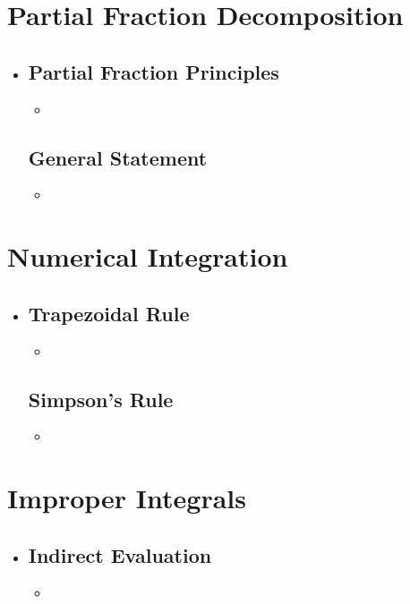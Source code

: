 \section{Partial Fraction Decomposition}
\begin{itemize}
  \item[]

  \subsection{Partial Fraction Principles}
  \begin{itemize}
    \item 
  \end{itemize}

  \subsection{General Statement}
  \begin{itemize}
    \item 
  \end{itemize}
   
\end{itemize}

\section{Numerical Integration}
\begin{itemize}
  \item []
  
  \subsection{Trapezoidal Rule}
  \begin{itemize}
    \item 
  \end{itemize}

  \subsection{Simpson's Rule}
  \begin{itemize}
    \item 
  \end{itemize}
  
\end{itemize}

\section{Improper Integrals}
\begin{itemize}
  \item []
  
  \subsection{Indirect Evaluation}
  \begin{itemize}
    \item 
  \end{itemize}
  
\end{itemize}
  